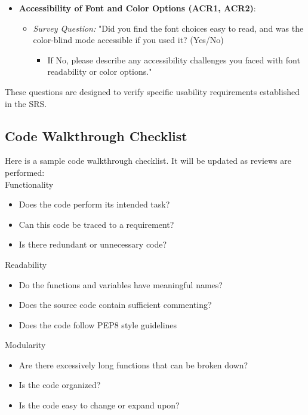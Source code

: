 \documentclass[12pt, titlepage]{article}
\begin{document}
\begin{itemize}
    \item \textbf{Accessibility of Font and Color Options (ACR1, ACR2)}:
    \begin{itemize}
        \item \textit{Survey Question:} "Did you find the font choices easy to read, and was the color-blind mode accessible if you used it? (Yes/No)  
        \begin{itemize}
            \item If No, please describe any accessibility challenges you faced with font readability or color options."
        \end{itemize}
    \end{itemize}
\end{itemize}

\noindent
These questions are designed to verify specific usability requirements established in the SRS.


\subsection{Code Walkthrough Checklist}
\label{A-Code-walkthrough-checklist}
Here is a sample code walkthrough checklist. It will be updated as reviews are performed:\\

\noindent
Functionality
\begin{itemize}[label=$\square$]
  \item Does the code perform its intended task?
  \item Can this code be traced to a requirement?
  \item Is there redundant or unnecessary code?
\end{itemize}

\noindent
Readability
\begin{itemize}[label=$\square$]
  \item Do the functions and variables have meaningful names?
  \item Does the source code contain sufficient commenting?
  \item Does the code follow PEP8 style guidelines
\end{itemize}

\noindent
Modularity
\begin{itemize}[label=$\square$]
  \item Are there excessively long functions that can be broken down?
  \item Is the code organized? 
  \item Is the code easy to change or expand upon?
\end{itemize}
\end{document}
